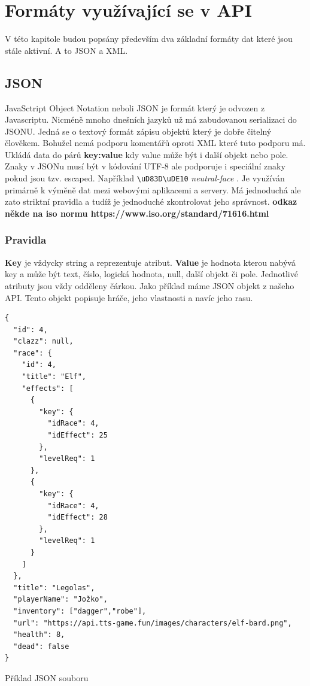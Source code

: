 \chapter{Formáty využívající se v API}
V této kapitole budou popsány především dva základní formáty dat které jsou stále aktivní. A to JSON a XML.

\section{JSON}
JavaSctript Object Notation neboli JSON je formát který je odvozen z Javascriptu. Nicméně mnoho dnešních jazyků už má zabudovanou serializaci do JSONU. Jedná se o textový formát zápisu objektů který je dobře čitelný člověkem. Bohužel nemá podporu komentářů oproti XML které tuto podporu má. Ukládá data do párů \textbf{key:value} kdy value může být i další objekt nebo pole. Znaky v JSONu musí být v kódování UTF-8 ale podporuje i speciální znaky pokud jsou tzv. escaped. Například \verb |\uD83D\uDE10| \textit{neutral-face} . Je využíván primárně k výměně dat mezi webovými aplikacemi a  servery. Má jednoduchá ale zato striktní pravidla a tudíž je jednoduché zkontrolovat jeho správnost. \textbf{odkaz někde na iso normu https://www.iso.org/standard/71616.html} %


\subsection{Pravidla}
\textbf{Key} je vždycky string a reprezentuje atribut. \textbf{Value} je hodnota kterou nabývá key a může být text, číslo, logická hodnota, null, další objekt či pole. Jednotlivé atributy jsou vždy odděleny čárkou. Jako příklad máme JSON objekt z našeho API. Tento objekt popisuje hráče, jeho vlastnosti a navíc jeho rasu.

\newpage

\begin{listing}
  \begin{verbatim}
{
  "id": 4,
  "clazz": null,
  "race": {
    "id": 4,
    "title": "Elf",
    "effects": [
      {
        "key": {
          "idRace": 4,
          "idEffect": 25
        },
        "levelReq": 1
      },
      {
        "key": {
          "idRace": 4,
          "idEffect": 28
        },
        "levelReq": 1
      }
    ]
  },
  "title": "Legolas",
  "playerName": "Jožko",
  "inventory": ["dagger","robe"],
  "url": "https://api.tts-game.fun/images/characters/elf-bard.png",
  "health": 8,
  "dead": false
}
  \end{verbatim}
  \caption{Příklad JSON souboru}
  \label{code:sumaradyasm}
\end{listing}

